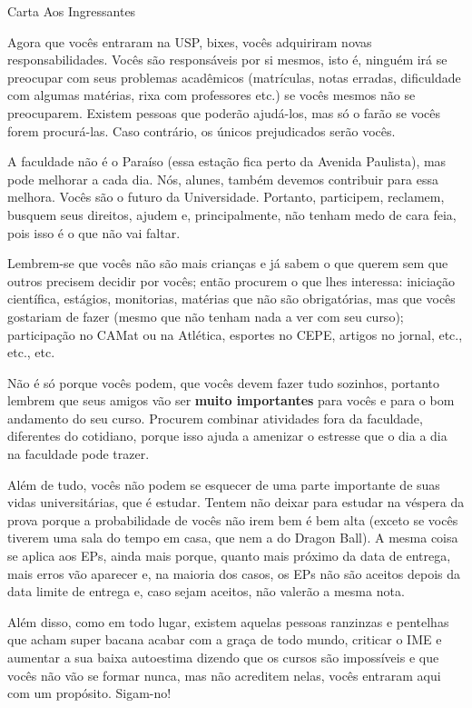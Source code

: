 \begin{editorial}{Carta Aos Ingressantes}

Agora que vocês entraram na USP, bixes, vocês adquiriram novas
responsabilidades. Vocês são responsáveis por si mesmos, isto é, ninguém irá se
preocupar com seus problemas acadêmicos (matrículas, notas erradas, dificuldade
com algumas matérias, rixa com professores etc.) se vocês mesmos não se
preocuparem. Existem pessoas que poderão ajudá-los, mas só o farão se vocês
forem procurá-las. Caso contrário, os únicos prejudicados serão vocês.

A faculdade não é o Paraíso (essa estação fica perto da Avenida Paulista), mas pode
melhorar a cada dia. Nós, alunes, também devemos contribuir para essa melhora.
Vocês são o futuro da Universidade. Portanto, participem, reclamem, busquem seus
direitos, ajudem e, principalmente, não tenham medo de cara feia, pois isso é o
que não vai faltar.

Lembrem-se que vocês não são mais crianças e já sabem o que querem sem que
outros precisem decidir por vocês; então procurem o que lhes interessa: iniciação
científica, estágios, monitorias, matérias que não são obrigatórias, mas que
vocês gostariam de fazer (mesmo que não tenham nada a ver com seu curso); participação
no CAMat ou na Atlética, esportes no CEPE, artigos no jornal, etc., etc., etc.

Não é só porque vocês podem, que vocês devem fazer tudo sozinhos, portanto lembrem que
seus amigos vão ser \textbf{muito importantes} para vocês e para o bom andamento do seu
curso. Procurem combinar atividades fora da faculdade, diferentes do cotidiano,
porque isso ajuda a amenizar o estresse que o dia a dia na faculdade pode
trazer.

Além de tudo, vocês não podem se esquecer de uma parte importante de suas vidas
universitárias, que é estudar. Tentem não deixar para estudar na véspera da
prova porque a probabilidade de vocês não irem bem é bem alta (exceto se vocês
tiverem uma sala do tempo em casa, que nem a do Dragon Ball). A mesma coisa se
aplica aos EPs, ainda mais porque, quanto mais próximo da data de entrega, mais
erros vão aparecer e, na maioria dos casos, os EPs não são aceitos depois da
data limite de entrega e, caso sejam aceitos, não valerão a mesma nota.

Além disso, como em todo lugar, existem aquelas pessoas ranzinzas e
pentelhas que acham super bacana acabar com a graça de todo mundo,
criticar o IME e aumentar a sua baixa autoestima dizendo que os cursos
são impossíveis e que vocês não vão se formar nunca, mas não acreditem
nelas, vocês entraram aqui com um propósito. Sigam-no!  


\end{editorial}
